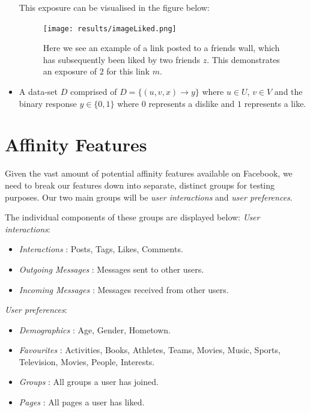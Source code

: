 \begin{itemize}
This exposure can be visualised in the figure below:

\begin{figure}[tbh!]
	\begin{center}
		\texttt{[image: results/imageLiked.png]}
		\caption{Here we see an example of a link posted to a friends wall, which has subsequently been liked by two friends $z$. This 
				 demonstrates an exposure of $2$ for this link $m$.}
	\end{center}
\end{figure}

\item A data-set $D$ comprised of $D = \{(u,v,x) \to y\}$ where $u \in U$, $v \in V$ and the binary response $y \in \{0,1\}$ 
where $0$ represents a dislike and $1$ represents a like. 
\end{itemize}

\section{Affinity Features}
\label{sec:features}

Given the vast amount of potential affinity features available on Facebook, we need to break our features down into separate, distinct 
groups for testing purposes. Our two main groups will be \emph{user interactions} and \emph{user preferences}.

The individual components of these groups are displayed below:
\emph{User interactions}:
\begin{itemize}
\item \emph{Interactions} : Posts, Tags, Likes, Comments.
\item \emph{Outgoing Messages} : Messages sent to other users.
\item \emph{Incoming Messages} : Messages received from other users.
\end{itemize}

\emph{User preferences}:
\begin{itemize}
\item \emph{Demographics} : Age, Gender, Hometown.
\item \emph{Favourites} : Activities, Books, Athletes, Teams, Movies, Music, Sports, Television, Movies, People, Interests.
\item \emph{Groups} : All groups a user has joined.
\item \emph{Pages} :  All pages a user has liked.
\end{itemize}

